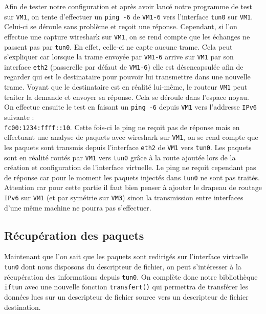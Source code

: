 \documentclass[a4paper, 12pt]{article}
\begin{document}
\begin{spacing}{1.1}
    Afin de tester notre configuration et après avoir lancé notre programme de 
    test sur \verb+VM1+, on tente d'effectuer un \verb+ping -6+ de \verb+VM1-6+
    vers l'interface \verb+tun0+ sur \verb+VM1+. Celui-ci se déroule sans 
    problème et reçoit une réponse. Cependant, si l'on effectue une capture 
    wireshark sur \verb+VM1+, on se rend compte que les échanges ne passent pas 
    par \verb+tun0+. En effet, celle-ci ne capte aucune trame. Cela peut 
    s'expliquer car lorsque la trame envoyée par \verb+VM1-6+ arrive sur 
    \verb+VM1+ par son interface \verb+eth2+ (passerelle par défaut de 
    \verb+VM1-6+) elle est désencapsulée afin de regarder qui est le 
    destinataire pour pouvoir lui transmettre dans une nouvelle trame. Voyant
    que le destinataire est en réalité lui-même, le routeur \verb+VM1+ peut 
    traiter la demande et envoyer sa réponse. Cela se déroule dans l'espace 
    noyau. \\

    On effectue ensuite le test en faisant un \verb+ping -6+ depuis \verb+VM1+
    vers l'addresse \verb+IPv6+ suivante : \\ \verb+fc00:1234:ffff::10+. Cette 
    fois-ci le ping ne reçoit pas de réponse mais en effectuant une analyse de 
    paquets avec wireshark sur \verb+VM1+, on se rend compte que les paquets 
    sont transmis depuis l'interface \verb+eth2+ de \verb+VM1+ vers \verb+tun0+.
    Les paquets sont en réalité routés par \verb+VM1+ vers \verb+tun0+ grâce à 
    la route ajoutée lors de la création et configuration de l'interface virtuelle.
    Le ping ne reçoit cependant pas de réponse car pour le moment les paquets 
    injectés dans \verb+tun0+ ne sont pas traités. Attention car pour cette 
    partie il faut bien penser à ajouter le drapeau de routage \verb+IPv6+ sur 
    \verb+VM1+ (et par symétrie sur \verb+VM3+) sinon la transmission entre 
    interfaces d'une même machine ne pourra pas s'effectuer. 

    \subsection{Récupération des paquets}
    Maintenant que l'on sait que les paquets sont redirigés sur l'interface
    virtuelle \verb+tun0+ dont nous disposons du descripteur de fichier, on 
    peut s'intéresser à la récupération des informations depuis \verb+tun0+. 
    On complète donc notre bibliothèque \verb+iftun+ avec une nouvelle fonction
    \verb+transfert()+ qui permettra de transférer les données lues sur un 
    descripteur de fichier source vers un descripteur de fichier destination. \\


\end{spacing}
\end{document}
